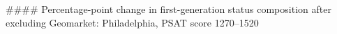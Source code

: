 #### Percentage-point change in first-generation status composition after excluding Geomarket: Philadelphia, PSAT score 1270–1520
